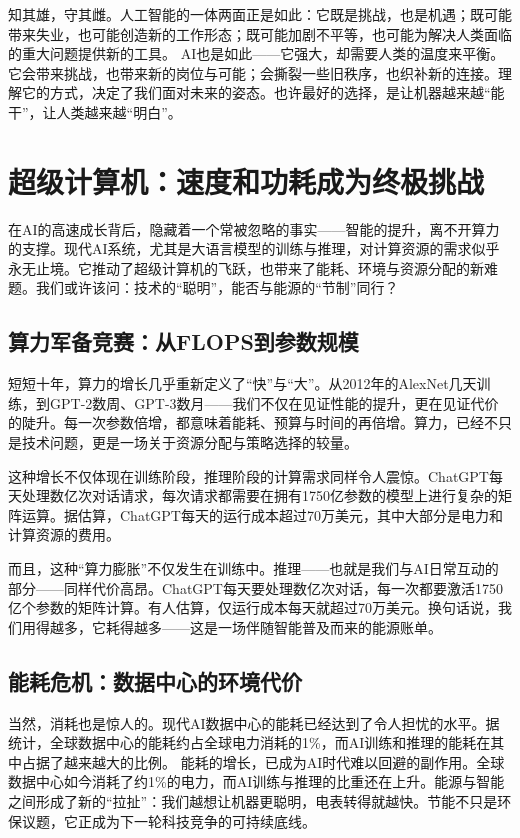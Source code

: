 知其雄，守其雌。人工智能的一体两面正是如此：它既是挑战，也是机遇；既可能带来失业，也可能创造新的工作形态；既可能加剧不平等，也可能为解决人类面临的重大问题提供新的工具。
AI也是如此——它强大，却需要人类的温度来平衡。它会带来挑战，也带来新的岗位与可能；会撕裂一些旧秩序，也织补新的连接。理解它的方式，决定了我们面对未来的姿态。也许最好的选择，是让机器越来越“能干”，让人类越来越“明白”。

\section{超级计算机：速度和功耗成为终极挑战}

在AI的高速成长背后，隐藏着一个常被忽略的事实——智能的提升，离不开算力的支撑。现代AI系统，尤其是大语言模型的训练与推理，对计算资源的需求似乎永无止境。它推动了超级计算机的飞跃，也带来了能耗、环境与资源分配的新难题。我们或许该问：技术的“聪明”，能否与能源的“节制”同行？

\subsection{算力军备竞赛：从FLOPS到参数规模}

短短十年，算力的增长几乎重新定义了“快”与“大”。从2012年的AlexNet几天训练，到GPT-2数周、GPT-3数月——我们不仅在见证性能的提升，更在见证代价的陡升。每一次参数倍增，都意味着能耗、预算与时间的再倍增。算力，已经不只是技术问题，更是一场关于资源分配与策略选择的较量。

这种增长不仅体现在训练阶段，推理阶段的计算需求同样令人震惊。ChatGPT每天处理数亿次对话请求，每次请求都需要在拥有1750亿参数的模型上进行复杂的矩阵运算。据估算，ChatGPT每天的运行成本超过70万美元，其中大部分是电力和计算资源的费用。

而且，这种“算力膨胀”不仅发生在训练中。推理——也就是我们与AI日常互动的部分——同样代价高昂。ChatGPT每天要处理数亿次对话，每一次都要激活1750亿个参数的矩阵计算。有人估算，仅运行成本每天就超过70万美元。换句话说，我们用得越多，它耗得越多——这是一场伴随智能普及而来的能源账单。

\subsection{能耗危机：数据中心的环境代价}

当然，消耗也是惊人的。现代AI数据中心的能耗已经达到了令人担忧的水平。据统计，全球数据中心的能耗约占全球电力消耗的1\%，而AI训练和推理的能耗在其中占据了越来越大的比例。
能耗的增长，已成为AI时代难以回避的副作用。全球数据中心如今消耗了约1\%的电力，而AI训练与推理的比重还在上升。能源与智能之间形成了新的“拉扯”：我们越想让机器更聪明，电表转得就越快。节能不只是环保议题，它正成为下一轮科技竞争的可持续底线。

